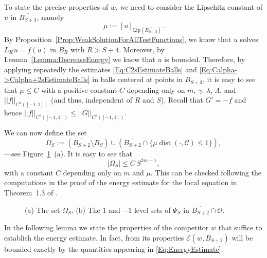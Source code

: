 \documentclass[12pt,reqno]{amsart}
\theoremstyle{definition}
\theoremstyle{remark}
\newcommand{\ccal}{\mathscr{C}}
\newcommand{\ecal}{\mathcal{E}}
\newcommand{\ocal}{\mathcal{O}}
\newcommand{\norm}[1]{\left | \left |{#1} \right | \right |}
\newcommand{\seminorm}[1]{\left [ {#1} \right ] }
\newcommand{\s}{\gamma}
\DeclareMathOperator{\dist}{dist}
\numberwithin{equation}{section}
\begin{document}
To state the precise properties of $w$, we need to consider the Lipschitz constant of $u$ in $\overline{B_{S+3}}$, namely
\begin{equation} 
\label{Eq:ChoiceMu} 
	\mu := \seminorm{u}_{\mathrm{Lip}(\overline{B_{S+3}})}. 
\end{equation} 
By Proposition~\ref{Prop:WeakSolutionForAllTestFunctions}, we know that $u$ solves $L_K u = f(u)$ in $B_R$ with $R> S+4$. Moreover, by Lemma~\ref{Lemma:DecreaseEnergy} we know that $u$ is bounded. Therefore, by applying repeatedly the estimates \eqref{Eq:C2sEstimateBalls} and \eqref{Eq:Calpha->Calpha+2sEstimateBalls} in balls centered at points in $B_{S+3}$, it is easy to see that $\mu\leq C$ with a positive constant $C$ depending only on $m$, $\s$, $\lambda$, $\Lambda$, and $\norm{f}_{C^1([-1,1])}$ (and thus, independent of $R$ and $S$). Recall that $G' = -f$ and hence $\norm{f}_{C^1([-1,1])} \leq \norm{G}_{C^2([-1,1])}$.

We can now define the set
\begin{equation}
\label{Eq:DefOmegaS}
\Omega_S := \left( \overline{B_{S+2}}\setminus B_S \right) \cup \left(  \overline{B_{S+2}} \cap \{\mu \dist(\cdot,\ccal) \leq 1\}\right),
\end{equation} 
---see Figure~\ref{Fig:PsiSandOmegaS}~(a). It is easy to see that 
\begin{equation}
\label{Eq:MeasureOmegaS}
|\Omega_S| \leq C\,S^{2m-1},
\end{equation}
with a constant $C$ depending only on $m$ and $\mu$. This can be checked following the computations in the proof of the energy estimate for the local equation in Theorem~1.3 of \cite{CabreTerraI}. 

\begin{figure}
	\centering
	\hspace{-0.26\textwidth} 
	\begin{subfigure}{0.21\textwidth}
		\centering
		
	\end{subfigure}
	\hspace{0.28\textwidth} 
	\begin{subfigure}{0.21\textwidth}
		\centering		
		
	\end{subfigure}
	\caption{(a) The set $\Omega_S$. (b) The $1$ and $-1$ level sets of $\Psi_S$ in $\overline{B_{S+2}}\cap \ocal$.}
	\label{Fig:PsiSandOmegaS}
\end{figure}

In the following lemma we state the properties of the competitor $w$ that suffice to establish the energy estimate. In fact, from its properties $\ecal(w,B_{S+2})$ will be bounded exactly by the quantities appearing in \eqref{Eq:EnergyEstimate}.
\end{document}
